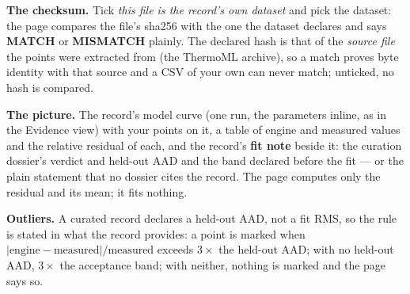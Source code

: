 \documentclass[11pt,a4paper]{article}
\begin{document}
\textbf{The checksum.}  Tick \emph{this file is the record's own dataset} and
pick the dataset: the page compares the file's sha256 with the one the dataset
declares and says \textbf{MATCH} or \textbf{MISMATCH} plainly.  The declared
hash is that of the \emph{source file} the points were extracted from (the
ThermoML archive), so a match proves byte identity with that source and a CSV
of your own can never match; unticked, no hash is compared.

\textbf{The picture.}  The record's model curve (one  run, the
parameters inline, as in the Evidence view) with your points on it, a table of
engine and measured values and the relative residual of each, and the record's
\textbf{fit note} beside it: the curation dossier's verdict and held-out AAD
and the band declared before the fit --- or the plain statement that no dossier
cites the record.  The page computes only the residual and its mean; it fits
nothing.

\textbf{Outliers.}  A curated record declares a held-out AAD, not a fit RMS, so
the rule is stated in what the record provides: a point is marked when
$|\text{engine}-\text{measured}|/\text{measured}$ exceeds $3\times$ the
held-out AAD; with no held-out AAD, $3\times$ the acceptance band; with neither,
nothing is marked and the page says so.
\end{document}
